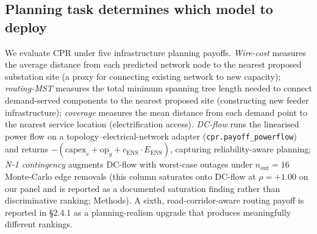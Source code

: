 \documentclass[10pt,a4paper]{article}
\begin{document}
\subsection{Planning task determines which model to deploy}

We evaluate CPR under five infrastructure planning payoffs.
\emph{Wire-cost} measures the average distance from each predicted
network node to the nearest proposed substation site (a proxy for
connecting existing network to new capacity); \emph{routing-MST}
measures the total minimum spanning tree length needed to connect
demand-served components to the nearest proposed site
(constructing new feeder infrastructure); \emph{coverage} measures
the mean distance from each demand point to the nearest service
location (electrification access). \emph{DC-flow} runs the
linearised power flow on a topology--electrical-network adapter
(\texttt{cpr.payoff\_powerflow}) and returns
$- (\mathrm{capex}_e + \mathrm{op}_g + c_{\mathrm{ENS}} \cdot
E_{\mathrm{ENS}})$, capturing reliability-aware planning;
\emph{N-1 contingency} augments DC-flow with worst-case outages
under $n_{\mathrm{out}} = 16$ Monte-Carlo edge removals
(this column saturates onto DC-flow at $\rho = +1.00$ on our panel
and is reported as a documented saturation finding rather than
discriminative ranking; Methods). A sixth, road-corridor-aware
routing payoff is reported in §2.4.1 as a planning-realism upgrade
that produces meaningfully different rankings.
\end{document}
